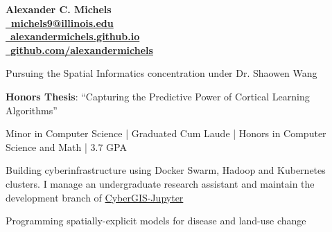 \documentclass{acmresume}
\begin{document}
	
	\begin{multicols}{2}
		\vspace*{.15cm}
		\textbf{\Huge Alexander C. Michels} \\
		\columnbreak
        \hfill\href{mailto:alexandercm4297@gmail.com}{\textbf{\faEnvelope~michels9@illinois.edu}} \\
		\hfill\href{http://alexandermichels.github.io}{\faGlobeAmericas~\textbf{alexandermichels.github.io}} \\
		\hfill\href{https://github.com/alexandermichels}{\faGithub~\textbf{github.com/alexandermichels}}
	\end{multicols}
	
	
		\begin{titemize}
			\item{Pursuing the Spatial Informatics concentration under Dr. Shaowen Wang}
		\end{titemize}

		\begin{titemize}
            \item \textbf{Honors Thesis}: ``Capturing the Predictive Power of Cortical Learning Algorithms''
			\item{Minor in Computer Science | Graduated Cum Laude | Honors in Computer Science and Math | 3.7 GPA}
		\end{titemize}
	
	
        \begin{titemize}
            \item Building cyberinfrastructure using Docker Swarm, Hadoop and Kubernetes clusters. I manage an undergraduate research assistant and maintain the development branch of \href{https://cybergis.illinois.edu/project/cybergis-jupyter/}{CyberGIS-Jupyter}
            \item Programming spatially-explicit models for disease and land-use change
        \end{titemize}
	
\end{document}
